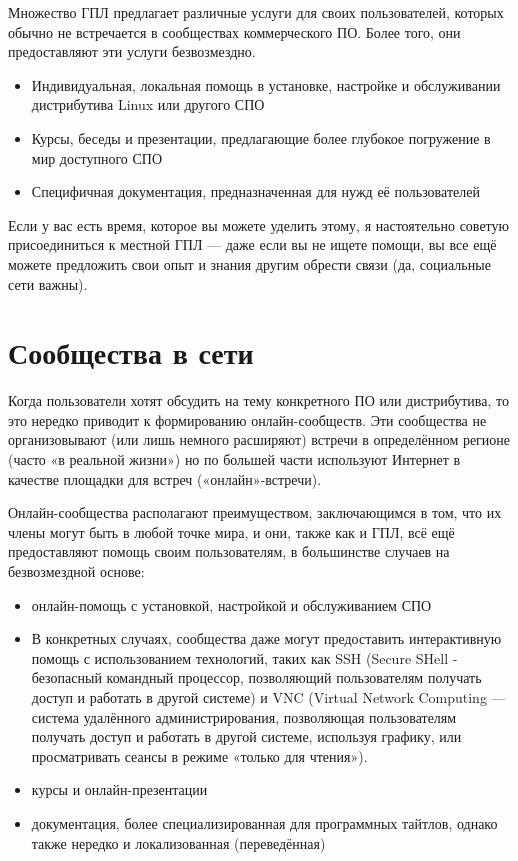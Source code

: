 \documentclass[12pt]{book}
\begin{document}
Множество ГПЛ предлагает различные услуги для своих пользователей, которых обычно не встречается в сообществах коммерческого ПО. Более того, они предоставляют эти услуги безвозмездно.

\begin{itemize}
	\item Индивидуальная, локальная помощь в установке, настройке и обслуживании дистрибутива Linux или другого СПО
	\item Курсы, беседы и презентации, предлагающие более глубокое погружение в мир доступного СПО
	\item Специфичная документация, предназначенная для нужд её пользователей
\end{itemize}

Если у вас есть время, которое вы можете уделить этому, я настоятельно советую присоединиться к местной ГПЛ — даже если вы не ищете помощи, вы все ещё можете предложить свои опыт и знания другим  обрести связи (да, социальные сети важны).

\section{Сообщества в сети}

Когда пользователи хотят обсудить на тему конкретного ПО или дистрибутива, то это нередко приводит к формированию онлайн-сообществ. Эти сообщества не организовывают (или лишь немного расширяют) встречи в определённом регионе (часто «в реальной жизни») но по большей части используют Интернет в качестве площадки для встреч («онлайн»-встречи).

Онлайн-сообщества располагают преимуществом, заключающимся в том, что их члены могут быть в любой точке мира, и они, также как и ГПЛ, всё ещё предоставляют помощь своим пользователям, в большинстве случаев на безвозмездной основе:

\begin{itemize}
	\item онлайн-помощь с установкой, настройкой и обслуживанием СПО
	\item В конкретных случаях, сообщества даже могут предоставить интерактивную помощь с использованием технологий, таких как SSH (Secure SHell - безопасный командный процессор, позволяющий пользователям получать доступ и работать в другой системе) и VNC (Virtual Network Computing — система удалённого администрирования,  позволяющая пользователям получать доступ и работать в другой системе, используя графику, или просматривать сеансы в режиме «только для чтения»).
	\item курсы и онлайн-презентации
	\item документация, более специализированная для программных тайтлов, однако также нередко и локализованная (переведённая)
\end{itemize}
\end{document}
